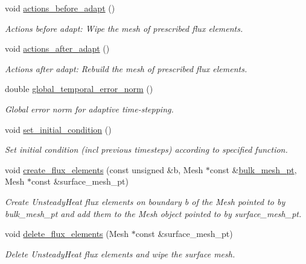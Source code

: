 \begin{DoxyCompactItemize}
void \hyperlink{classRefineableUnsteadyHeatProblem_a4419fcea0ccbf0509f1d5dd37d8301de}{actions\+\_\+before\+\_\+adapt} ()
\begin{DoxyCompactList}\small\item\em Actions before adapt\+: Wipe the mesh of prescribed flux elements. \end{DoxyCompactList}\item 
void \hyperlink{classRefineableUnsteadyHeatProblem_a1f8a9e91269440c799a2075f989d62b1}{actions\+\_\+after\+\_\+adapt} ()
\begin{DoxyCompactList}\small\item\em Actions after adapt\+: Rebuild the mesh of prescribed flux elements. \end{DoxyCompactList}\item 
double \hyperlink{classRefineableUnsteadyHeatProblem_a8db7ec06bde33713effabef4d4c4018d}{global\+\_\+temporal\+\_\+error\+\_\+norm} ()
\begin{DoxyCompactList}\small\item\em Global error norm for adaptive time-\/stepping. \end{DoxyCompactList}\item 
void \hyperlink{classRefineableUnsteadyHeatProblem_a30e2e1d62b059982f7014b74f4fe2be9}{set\+\_\+initial\+\_\+condition} ()
\begin{DoxyCompactList}\small\item\em Set initial condition (incl previous timesteps) according to specified function. \end{DoxyCompactList}\item 
void \hyperlink{classRefineableUnsteadyHeatProblem_a65601ec64c73ac578b43f4af04c46569}{create\+\_\+flux\+\_\+elements} (const unsigned \&b, Mesh $\ast$const \&\hyperlink{classRefineableUnsteadyHeatProblem_a4d8eec1505a3c53960a3182ec462b4e7}{bulk\+\_\+mesh\+\_\+pt}, Mesh $\ast$const \&surface\+\_\+mesh\+\_\+pt)
\begin{DoxyCompactList}\small\item\em Create Unsteady\+Heat flux elements on boundary b of the Mesh pointed to by bulk\+\_\+mesh\+\_\+pt and add them to the Mesh object pointed to by surface\+\_\+mesh\+\_\+pt. \end{DoxyCompactList}\item 
void \hyperlink{classRefineableUnsteadyHeatProblem_ad2e53af5c385e44e33e400b430b610e8}{delete\+\_\+flux\+\_\+elements} (Mesh $\ast$const \&surface\+\_\+mesh\+\_\+pt)
\begin{DoxyCompactList}\small\item\em Delete Unsteady\+Heat flux elements and wipe the surface mesh. \end{DoxyCompactList}\item 

\end{DoxyCompactItemize}
